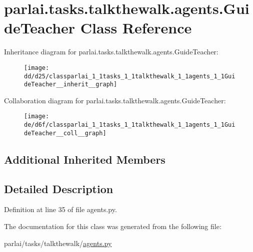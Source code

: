 \hypertarget{classparlai_1_1tasks_1_1talkthewalk_1_1agents_1_1GuideTeacher}{}\section{parlai.\+tasks.\+talkthewalk.\+agents.\+Guide\+Teacher Class Reference}
\label{classparlai_1_1tasks_1_1talkthewalk_1_1agents_1_1GuideTeacher}


Inheritance diagram for parlai.\+tasks.\+talkthewalk.\+agents.\+Guide\+Teacher\+:
\nopagebreak
\begin{figure}[H]
\begin{center}
\leavevmode
\texttt{[image: dd/d25/classparlai\_1\_1tasks\_1\_1talkthewalk\_1\_1agents\_1\_1GuideTeacher\_\_inherit\_\_graph]}
\end{center}
\end{figure}


Collaboration diagram for parlai.\+tasks.\+talkthewalk.\+agents.\+Guide\+Teacher\+:
\nopagebreak
\begin{figure}[H]
\begin{center}
\leavevmode
\texttt{[image: de/d6f/classparlai\_1\_1tasks\_1\_1talkthewalk\_1\_1agents\_1\_1GuideTeacher\_\_coll\_\_graph]}
\end{center}
\end{figure}
\subsection*{Additional Inherited Members}


\subsection{Detailed Description}


Definition at line 35 of file agents.\+py.



The documentation for this class was generated from the following file\+:\begin{DoxyCompactItemize}
\item 
parlai/tasks/talkthewalk/\hyperlink{parlai_2tasks_2talkthewalk_2agents_8py}{agents.\+py}\end{DoxyCompactItemize}
